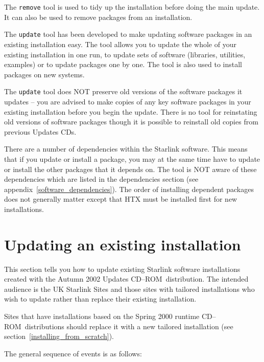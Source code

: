 \documentclass[twoside,11pt]{article}
\newcommand{\htmlref}[2]{#1}
\newcommand{\latex}[1]{#1}
\newcommand{\xlabel}[1]{}
\renewcommand{\_}{\texttt{\symbol{95}}}
\newcommand{\cdrom}{CD--ROM}
\newcommand{\cdrom}{CD-ROM}
\begin{document}
The \texttt{remove} tool is used to tidy up the installation before doing
the main update.  It can also be used to remove packages from an installation.

The \texttt{update} tool has been developed to make updating software
packages in an existing installation easy.  The tool allows you to
update the whole of your existing installation in one run, to update
sets of software (libraries, utilities, examples) or to update packages
one by one.  The tool is also used to install packages on new systems.

The \texttt{update} tool does NOT preserve old versions of the software packages it
updates -- you are advised to make copies of any key software packages
in your existing installation before you begin the update.  There is no
tool for reinstating old versions of software packages though it is possible
to reinstall old copies from previous Updates CDs.

There are a number of dependencies within the Starlink software.  This
means that if you update or install a package, you may at the same 
time have to update or install the other packages that it depends on.
The tool is NOT aware of these dependencies which are listed in the
\htmlref{dependencies section}{software_dependencies}
\latex{(see appendix~\ref{software_dependencies})}.
The order of installing dependent packages does not generally matter except 
that HTX must be installed first for new installations.

\newpage

\section{\xlabel{updating_an_existing_installation}Updating an existing installation}
\label{updating_an_existing_installation}

This section tells you how to update existing Starlink software
installations created with the Autumn 2002 Updates \cdrom\ distribution.
The intended audience is the UK Starlink Sites and those sites with
tailored installations who wish to update rather than replace their
existing installation.

Sites that have installations based on the Spring 2000 runtime \cdrom\
distributions should replace it with a new
\htmlref{tailored installation}{installing_from_scratch} (see
section~\ref{installing_from_scratch}). 

The general sequence of events is as follows:
\end{document}
